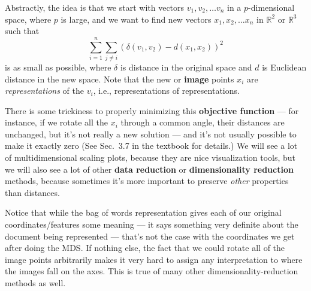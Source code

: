 \documentclass{article}
\begin{document}
Abstractly, the idea is that we start with vectors $v_1, v_2, \ldots v_n$ in a
$p$-dimensional space, where $p$ is large, and we want to find new vectors
$x_1, x_2, \ldots x_n$ in $\mathbb{R}^2$ or $\mathbb{R}^3$ such that
\[
\sum_{i=1}^{n}{\sum_{j\neq i}{{\left(\delta(v_1, v_2) - d(x_1,x_2)\right)}^2}}
\]
is as small as possible, where $\delta$ is distance in the original space and
$d$ is Euclidean distance in the new space.  Note that the new or {\bf image}
points $x_i$ are {\em representations} of the $v_i$, i.e., representations of
representations.

There is some trickiness to properly minimizing this \textbf{objective
  function} --- for instance, if we rotate all the $x_i$ through a common
angle, their distances are unchanged, but it's not really a new solution ---
and it's not usually possible to make it exactly zero (See Sec.\ 3.7 in the
textbook for details.)  We will see a lot of multidimensional scaling plots,
because they are nice visualization tools, but we will also see a lot of other
{\bf data reduction} or {\bf dimensionality reduction} methods, because
sometimes it's more important to preserve {\em other} properties than
distances.

Notice that while the bag of words representation gives each of our original
coordinates/features some meaning --- it says something very definite about the
document being represented --- that's not the case with the coordinates we get
after doing the MDS.  If nothing else, the fact that we could rotate all of the
image points arbitrarily makes it very hard to assign any interpretation to
where the images fall on the axes.  This is true of many other
dimensionality-reduction methods as well.
\end{document}
